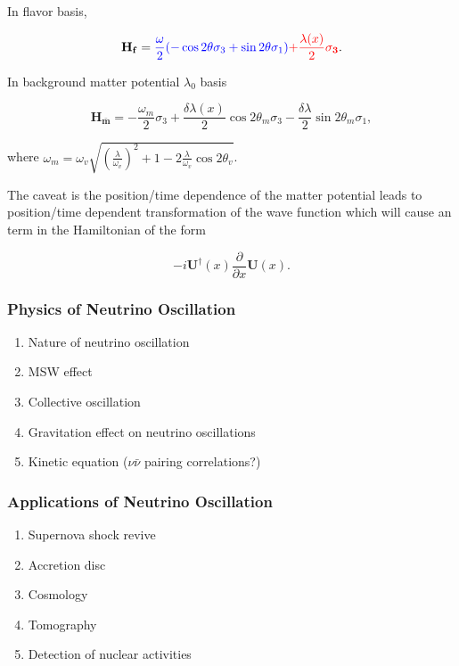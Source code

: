 \documentclass{sciposter}
\begin{document}
\begin{multicols}{3}
In flavor basis,

\begin{equation}
    \mathbf{H_f} = {\color{blue}\frac{\omega}{2}( -\cos2\theta \sigma_3 + \sin 2\theta \sigma_1 )  } {\color{red} + \frac{\lambda(x)}{2} \mathbf {\sigma_3}}   .
\end{equation}


In background matter potential $\lambda_0$ basis

\begin{equation}
    \mathbf{H_{\bar m} } = -\frac{\omega_m}{2} \sigma_3 + \frac{\delta \lambda(x)}{2} \cos 2\theta_m \sigma_3 - \frac{\delta \lambda}{2} \sin 2\theta_m \sigma_1 ,
\end{equation}

where $\omega_m = \omega_v \sqrt{ \left( \frac{\lambda}{\omega_v} \right) ^2  +1 - 2 \frac{\lambda}{\omega_v} \cos 2\theta_v  }$.


The caveat is the position/time dependence of the matter potential leads to position/time dependent transformation of the wave function which will cause an term in the Hamiltonian of the form

\begin{equation}
     - i \mathbf{U}^\dagger (x) \frac{\partial}{\partial x} \mathbf{U}(x).
\end{equation}




\subsubsection{Physics of Neutrino Oscillation}


\begin{enumerate}
    \item Nature of neutrino oscillation
    \item MSW effect
    \item Collective oscillation
    \item Gravitation effect on neutrino oscillations
    \item Kinetic equation ($\nu\bar\nu$ pairing correlations?)
\end{enumerate}


\subsubsection{Applications of Neutrino Oscillation}


\begin{enumerate}
\item Supernova shock revive
\item Accretion disc
\item Cosmology
\item {\color{darkgray}Tomography}
\item {\color{gray}Detection of nuclear activities}
\end{enumerate}


\end{multicols}
\end{document}
